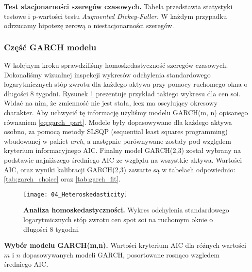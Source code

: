 \begin{table}
	\centering
	
	\caption{\textbf{Test stacjonarności szeregów czasowych.} Tabela przedstawia statystyki testowe i p-wartości testu \emph{Augmented Dickey-Fuller}. W każdym przypadku odrzucamy hipotezę zerową o niestacjonarności szeregów.
		\label{tab:adf_test}}
\end{table}

\FloatBarrier
\subsubsection{Część GARCH modelu}
W kolejnym kroku sprawdziliśmy homoskedastyczność szeregów czasowych. Dokonaliśmy wizualnej inspekcji wykresów odchylenia standardowego logarytmicznych stóp zwrotu dla każdego aktywa przy pomocy ruchomego okna o długości $8$ tygodni. Rysunek \ref{fig:homoskedasticity} prezentuje przykład takiego wykresu dla cen soi. Widać na nim, że zmienność nie jest stała, lecz ma oscylujący okresowy charakter. Aby uchwycić tę informację użyliśmy modelu GARCH(m, n) opisanego równaniem \ref{eq:garch_part}. Modele były dopasowywane dla każdego aktywa osobno, za pomocą metody SLSQP (sequential least squares programming) wbudowanej w pakiet \emph{arch}, a następnie porównywane zostały pod względem kryterium informacyjnego AIC. Finalny model GARCH(2,3) został wybrany na podstawie najniższego średniego AIC ze względu na wszystkie aktywa. Wartości AIC, oraz wyniki kalibracji GARCH(2,3) zawarte są w tabelach odpowiednio: \ref{tab:garch_choice} oraz \ref{tab:garch_fit}.

\begin{figure}[h]
	\centering
	\texttt{[image: 04\_Heteroskedasticity]}
	\caption{\textbf{Analiza homoskedastyczności.} Wykres odchylenia standardowego logarytmicznych stóp zwrotu cen spot soi na ruchomym oknie o długości 8 tygodni. \label{fig:homoskedasticity}}
\end{figure}

\begin{table}
	\centering
	
	\caption{\textbf{Wybór modelu GARCH(m,n).} Wartości kryterium AIC dla różnych wartości $m$ i $n$ dopasowywanych modeli GARCH, posortowane rosnąco wzgledem średniego AIC. \label{tab:garch_choice}}
\end{table}

